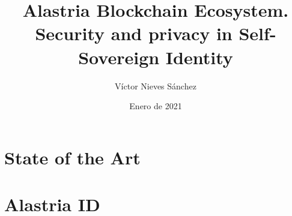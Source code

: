 \documentclass[a4paper, 12pt]{article} %
\author{Víctor Nieves Sánchez}
\date{Enero de 2021}
\title{Alastria Blockchain Ecosystem. Security and privacy in Self-Sovereign Identity}
\begin{document}
\maketitle
\null
\newpage


\begin{otherlanguage}{spanish}
    \renewcommand{\spanishabstractname}{Agradecimientos}
    \begin{abstract}
        
    \end{abstract}
\end{otherlanguage}

\newpage
\tableofcontents

\newpage
\listoffigures

\newpage
\listoftables

\newpage
\lstlistoflistings

\newpage
\printglossary[type=\acronymtype]

\newpage
\begin{otherlanguage}{spanish}
    \renewcommand{\spanishabstractname}{Resumen}
    \begin{abstract}
        \normalsize
        
    \end{abstract}
\end{otherlanguage}

\newpage
\begin{abstract}
    \normalsize
    
\end{abstract}

\newpage
{} %
\UseRawInputEncoding %


\newpage
\section{State of the Art}






\newpage
\section{Alastria ID}





\end{document}
